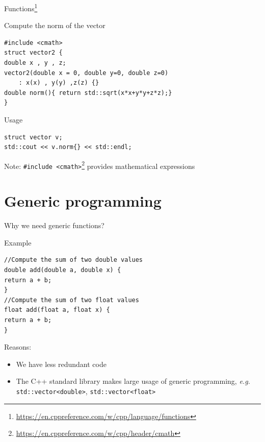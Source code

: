 \documentclass[12pt,t]{beamer}
\begin{document}
\begin{frame}[fragile]{Functions\footnote{\tiny\url{https://en.cppreference.com/w/cpp/language/functions}}}
\begin{block}{Compute the norm of the vector}
\begin{lstlisting}
#include <cmath>
struct vector2 {
double x , y , z;
vector2(double x = 0, double y=0, double z=0)
	: x(x) , y(y) ,z(z) {}
double norm(){ return std::sqrt(x*x+y*y+z*z);}
}
\end{lstlisting}
\end{block}

\begin{block}{Usage}
\begin{lstlisting}
struct vector v;
std::cout << v.norm{} << std::endl;
\end{lstlisting}
\end{block}
Note: \lstinline|#include <cmath>|\footnote{\tiny\url{https://en.cppreference.com/w/cpp/header/cmath}} provides mathematical expressions
\end{frame}

\section{Generic programming}

\begin{frame}[fragile]{Why we need generic functions?}

\begin{block}{Example}
\begin{lstlisting}
//Compute the sum of two double values
double add(double a, double x) {
return a + b;
}
//Compute the sum of two float values
float add(float a, float x) {
return a + b;
}
\end{lstlisting}
\end{block}

\begin{block}{Reasons:}
\begin{itemize}
\item We have less redundant code
\item The C++ standard library makes large usage of generic programming, \emph{e.g.} \lstinline|std::vector<double>|, \lstinline|std::vector<float>|
\end{itemize}
\end{block}

\end{frame}
\end{document}
